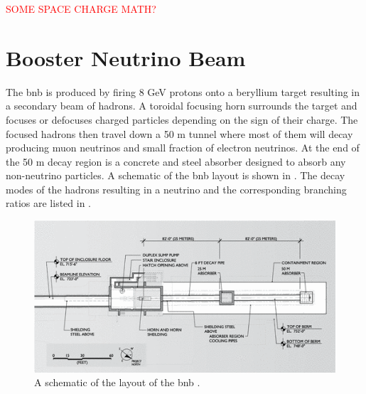 \textcolor{red}{SOME SPACE CHARGE MATH?}

\section{Booster Neutrino Beam}\label{sec:BNB}
The \gls{bnb} is produced by firing 8 GeV protons onto a beryllium target resulting in a secondary beam of hadrons. A toroidal focusing horn surrounds the target and focuses or defocuses charged particles depending on the sign of their charge. The focused hadrons then travel down a 50 m tunnel where most of them will decay producing muon neutrinos and small fraction of electron neutrinos. At the end of the 50 m decay region is a concrete and steel absorber designed to absorb any non-neutrino particles. A schematic of the \gls{bnb} layout is shown in . The decay modes of the hadrons resulting in a neutrino and the corresponding branching ratios are listed in . 

\begin{figure}
    \centering
    \includegraphics[width =\largefigwidth]{figures-chap3/BNB_schematic.png}
    \caption[Schematic of the BNB layout.]{A schematic of the layout of the \gls{bnb} \cite{BNB_flux}.}
    \label{fig: BNB schematic}
\end{figure}

